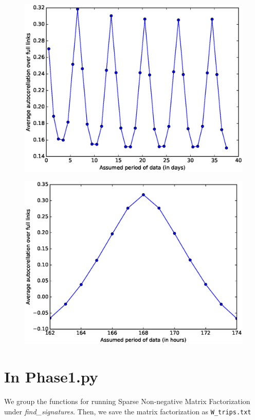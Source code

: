 \documentclass[12pt,letterpaper]{article}
\begin{document}
\begin{figure}[H]
\centering
\includegraphics[width=.9\textwidth]{Autocorrelation_Full_Links.ps}
\end{figure}

\begin{figure}[H]
\centering
\includegraphics[width=.9\textwidth]{Autocorrelation_Full_Links_hourly.ps}
\end{figure}

\section{In Phase1.py}
We group the functions for running Sparse Non-negative Matrix Factorization under \textsl{find\_signatures}.
Then, we save the matrix factorization as \texttt{W\_trips.txt}
\end{document}
